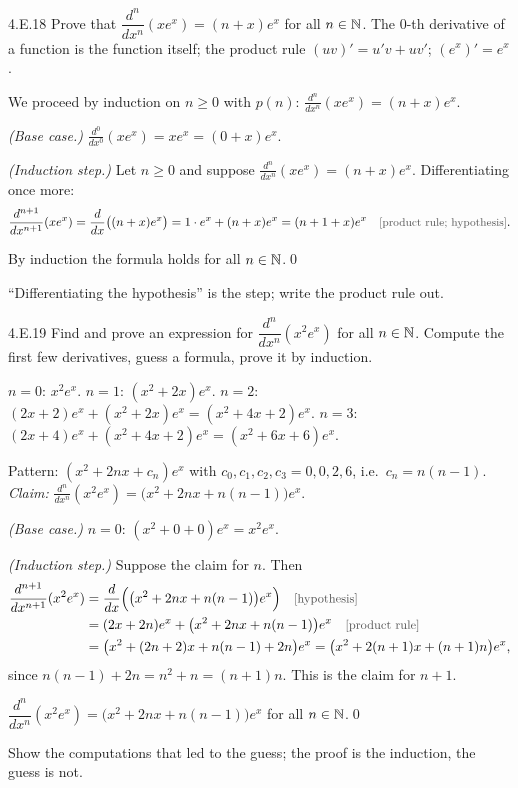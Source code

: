 \begin{bookex}[essential]{4.E.18}
Prove that $\dfrac{d^n}{dx^n}(xe^x)=(n+x)e^x$ for all $n\in\mathbb{N}$.
\solution
\given The $0$-th derivative of a function is the function itself; the product rule $(uv)'=u'v+uv'$; $(e^x)'=e^x$.
\begin{steps}
\item We proceed by induction on $n\ge0$ with $p(n)$: $\frac{d^n}{dx^n}(xe^x)=(n+x)e^x$.
\item \emph{(Base case.)} $\frac{d^0}{dx^0}(xe^x)=xe^x=(0+x)e^x$.
\item \emph{(Induction step.)} Let $n\ge0$ and suppose $\frac{d^n}{dx^n}(xe^x)=(n+x)e^x$. Differentiating once more:
\[
\frac{d^{n+1}}{dx^{n+1}}(xe^x)=\frac d{dx}\big((n+x)e^x\big)=1\cdot e^x+(n+x)e^x=(n+1+x)e^x \why{product rule; hypothesis}.
\]
\end{steps}
\conclusion By induction the formula holds for all $n\in\mathbb{N}$.\qed
\begin{compare}
\item ``Differentiating the hypothesis'' is the step; write the product rule out.
\end{compare}
\end{bookex}

\begin{bookex}[essential]{4.E.19}
Find and prove an expression for $\dfrac{d^n}{dx^n}(x^2e^x)$ for all $n\in\mathbb{N}$.
\solution
\plan Compute the first few derivatives, guess a formula, prove it by induction.
\begin{steps}
\item $n=0$: $x^2e^x$. $n=1$: $(x^2+2x)e^x$. $n=2$: $(2x+2)e^x+(x^2+2x)e^x=(x^2+4x+2)e^x$. $n=3$: $(2x+4)e^x+(x^2+4x+2)e^x=(x^2+6x+6)e^x$.
\item Pattern: $(x^2+2nx+c_n)e^x$ with $c_0,c_1,c_2,c_3=0,0,2,6$, i.e.\ $c_n=n(n-1)$. \emph{Claim:} $\frac{d^n}{dx^n}(x^2e^x)=\big(x^2+2nx+n(n-1)\big)e^x$.
\item \emph{(Base case.)} $n=0$: $(x^2+0+0)e^x=x^2e^x$.
\item \emph{(Induction step.)} Suppose the claim for $n$. Then
\begin{align*}
\frac{d^{n+1}}{dx^{n+1}}(x^2e^x)&=\frac d{dx}\Big(\big(x^2+2nx+n(n-1)\big)e^x\Big)\why{hypothesis}\\
&=(2x+2n)e^x+\big(x^2+2nx+n(n-1)\big)e^x\why{product rule}\\
&=\big(x^2+(2n+2)x+n(n-1)+2n\big)e^x=\big(x^2+2(n+1)x+(n+1)n\big)e^x,
\end{align*}
since $n(n-1)+2n=n^2+n=(n+1)n$. This is the claim for $n+1$.
\end{steps}
\conclusion $\dfrac{d^n}{dx^n}(x^2e^x)=\big(x^2+2nx+n(n-1)\big)e^x$ for all $n\in\mathbb{N}$.\qed
\begin{compare}
\item Show the computations that led to the guess; the proof is the induction, the guess is not.
\end{compare}
\end{bookex}


